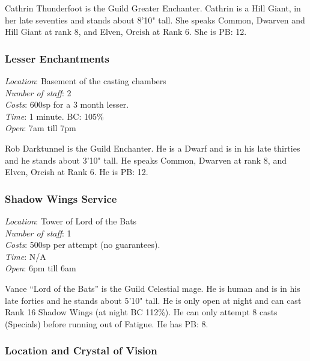 \documentclass[twoside,a4paper]{article}
\begin{document}
\begin{multicols}{2}
Cathrin Thunderfoot is the Guild Greater Enchanter. Cathrin is a Hill
Giant, in her late seventies and stands about 8'10" tall. She speaks
Common, Dwarven and Hill Giant at rank 8, and Elven, Orcish at Rank
6. She is PB: 12.

\subsubsection{Lesser Enchantments}

\begin{flushleft}
\emph{Location}: Basement of the casting chambers \\
\emph{Number of staff}: 2 \\
\emph{Costs}: 600sp for a 3 month lesser. \\
\emph{Time}: 1 minute. BC: 105\% \\
\emph{Open}: 7am till 7pm \\
\end{flushleft}
Rob Darktunnel is the Guild Enchanter. He is a Dwarf and is in his
late thirties and he stands about 3'10" tall. He speaks Common,
Dwarven at rank 8, and Elven, Orcish at Rank 6. He is PB: 12.

\subsubsection{Shadow Wings Service}

\begin{flushleft}
\emph{Location}: Tower of Lord of the Bats \\
\emph{Number of staff}: 1 \\
\emph{Costs}: 500sp per attempt (no guarantees). \\
\emph{Time}: N/A \\
\emph{Open}: 6pm till 6am \\
\end{flushleft}
Vance ``Lord of the Bats'' is the Guild Celestial mage. He is human
and is in his late forties and he stands about 5'10" tall. He is only
open at night and can cast Rank 16 Shadow Wings (at night BC
112\%). He can only attempt 8 casts (Specials) before running out of
Fatigue. He has PB: 8.

\subsubsection{Location and Crystal of Vision}


\end{multicols}
\end{document}
